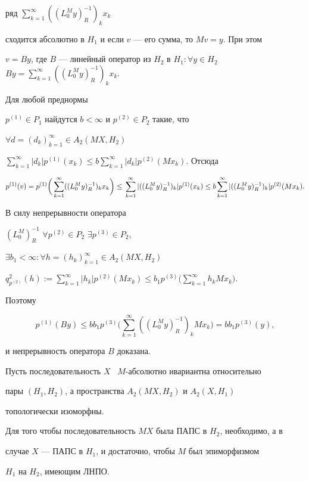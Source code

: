 ряд $\sum\limits_{k=1}^{\infty}((L_0^My)_R^{-1})_kx_k$


сходится абсолютно в $H_1$ и если $v$ --- его сумма, то $Mv=y$. При этом


$v=By$, где $B$ --- линейный оператор из $H_2$ в $H_1:


\forall y\in H_2$ \ $By=\sum\limits_{k=1}^{\infty}((L_0^My)_R^{-1})_kx_k$.


Для любой преднормы


$p^{(1)}\in P_1$ найдутся $b<\infty$ и $p^{(2)}\in P_2$ такие, что


$\forall d=(d_k)_{k=1}^{\infty}\in A_2(MX,H_2)$ \


$\sum\limits_{k=1}^{\infty}|d_k|p^{(1)}(x_k)\le b\sum\limits_{k=1}^


{\infty}|d_k|p^{(2)}(Mx_k)$. Отсюда


$$


p^{(1)}(v)=p^{(1)}\bigg(\sum_{k=1}^{\infty}((L_0^My)_R^{-1})_kx_k\bigg)\le \\


\sum_{k=1}^{\infty}|((L_0^My)_R^{-1})_k|p^{(1)}(x_k)\le


b\sum_{k=1}^{\infty}|((L_0^My)_R^{-1})_k|p^{(2)}(Mx_k).


$$


В силу непрерывности оператора


$(L_0^M)_R^{-1}$ \; $\forall p^{(2)}\in P_2$ \; $\exists p^{(3)} \in P_2$,


$\exists b_1<\infty: \forall h=(h_k)_{k=1}^{\infty}\in A_2(MX,H_2)$ \


$q^2_{p^{(2)}}(h):=\sum\limits_{k=1}^{\infty}|h_k|p^{(2)}(Mx_k)\le b_1p^{(3)}


\Big(\sum\limits_{k=1}^{\infty}h_k Mx_k\Big)$.


Поэтому


$$


p^{(1)}(By)\le bb_1p^{(3)}


\Big(\sum\limits_{k=1}^{\infty}((L_0^M y)_R^{-1})_k Mx_k\Big)=bb_1 p^{(3)}(y),


$$


и непрерывность оператора $B$ доказана.








\begin{cornonum}


Пусть последовательность $X$ \ $M$-абсолютно ивариантна относительно


пары $(H_1,H_2)$, а пространства $A_2(MX,H_2)$ и $A_2(X,H_1)$


топологически изоморфны.





Для того чтобы последовательность $MX$ была ПАПС в $H_2$, необходимо, а в


случае $X$ --- ПАПС в $H_1$, и достаточно, чтобы $M$ был эпиморфизмом


$H_1$ на $H_2$, имеющим ЛНПО.


\end{cornonum}





